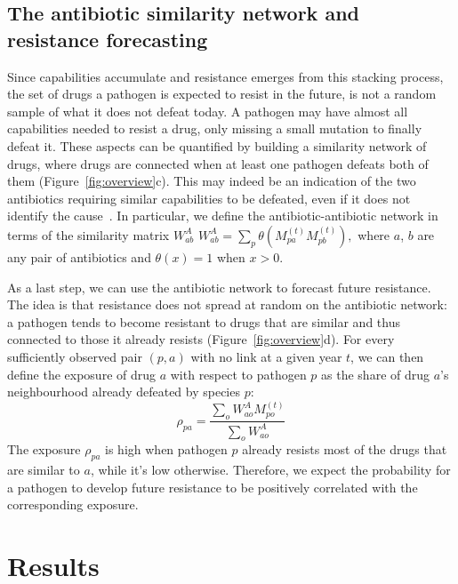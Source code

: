 \documentclass[10pt]{article}
\begin{document}
\subsection*{The antibiotic similarity network and resistance forecasting}

Since capabilities accumulate and resistance emerges from this stacking process, the set of drugs a pathogen is expected to resist in the future, is not a random sample of what it does not defeat today. A pathogen may have almost all capabilities needed to resist a drug, only missing a small mutation to finally defeat it. These aspects can be quantified by building a similarity network of drugs, where drugs are connected when at least one pathogen defeats both of them (Figure~\ref{fig:overview}c). This may indeed be an indication of the two antibiotics requiring similar capabilities to be defeated, even if it does not identify the cause~\cite{partridge2018,lazar2014}. In particular, we define the antibiotic-antibiotic network in terms of the similarity matrix $W^A_{ab}$
\(
 W^A_{ab}=\sum_p\theta(M^{(t)}_{pa}M^{(t)}_{pb}),
\)
where $a$, $b$ are any pair of antibiotics and $\theta(x)=1$ when $x>0$. 


As a last step, we can use the antibiotic network to forecast future resistance. The idea is that resistance does not spread at random on the antibiotic network: a pathogen tends to become resistant to drugs that are similar and thus connected to those it already resists (Figure~\ref{fig:overview}d). For every sufficiently observed pair \((p,a)\) with no link at a given year \(t\), we can then define the exposure of drug $a$ with respect to pathogen $p$ as the share of drug \(a\)'s neighbourhood already defeated by species \(p\):
\[
 \rho_{pa}=\frac{\sum_oW^A_{ao}M^{(t)}_{po}}{\sum_oW^A_{ao}}
\]
The exposure $\rho_{pa}$ is high when pathogen $p$ already resists most of the drugs that are similar to $a$, while it's low otherwise. Therefore, we expect the probability for a pathogen to develop future resistance to be positively correlated with the corresponding exposure.


\section*{Results}
\end{document}
